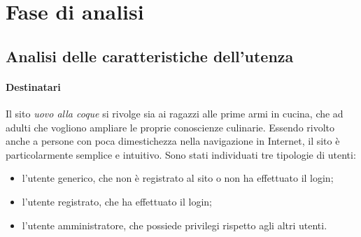 \section{Fase di analisi}
\subsection{Analisi delle caratteristiche dell'utenza}
\label{sub:analisi_delle_caratteristiche_dell_utenza}
\paragraph{Destinatari}
\label{par:destinatari}
Il sito \emph{uovo alla coque} si rivolge sia ai ragazzi alle prime armi in cucina, che ad adulti che vogliono ampliare le proprie conoscienze culinarie. Essendo rivolto anche a persone con poca dimestichezza nella navigazione in Internet, il sito è particolarmente semplice e intuitivo. \newline
Sono stati individuati tre tipologie di utenti:
\begin{itemize}
    \item l'utente generico, che non è registrato al sito o non ha effettuato il login;
    \item l'utente registrato, che ha effettuato il login;
    \item l'utente amministratore, che possiede privilegi rispetto agli altri utenti.
\end{itemize}

